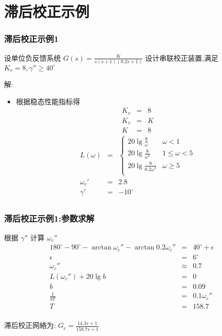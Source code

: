 \documentclass[table]{beamer}
\begin{document}
\section{滞后校正示例}
\label{sec-2}
\begin{frame}
\frametitle{滞后校正示例1}
\label{sec-2-1}

设单位负反馈系统 $G(s)=\frac{K}{s(s+1)(0.2s+1)}$ 设计串联校正装置,满足  $K_v=8, \gamma''\geq 40^{\circ}$ 

解:

\begin{itemize}
\item <2->根据稳态性能指标得
      \begin{eqnarray*}
      K_v & = &8 \\
      K_v &= & K \\
       K &=& 8
      \end{eqnarray*}
      \begin{eqnarray*}
      L(\omega) & = & \begin{cases}20\lg\frac{8}{\omega} & \omega <1 \\
                                   20\lg\frac{8}{\omega^2} & 1\leq \omega < 5 \\
                                   20\lg\frac{8}{0.2\omega^3} &  \omega \geq 5 \\  \end{cases}\\
      \omega_c' &=& 2.8 \\
      \gamma' &=& -10^{\circ} \\
      \end{eqnarray*}
\end{itemize}
\end{frame}
\begin{frame}
\frametitle{滞后校正示例1:参数求解}
\label{sec-2-2}

根据  $\gamma''$  计算  $\omega_c''$ 
\begin{eqnarray*}
180^{\circ}-90^{\circ}-\arctan\omega_c''-\arctan0.2\omega_c'' & = & 40^{\circ}+\epsilon\\
\epsilon &=& 6^{\circ} \\
\omega_c'' &\approx& 0.7 \\
L(\omega_c'') +20\lg b&=& 0 \\
b &=& 0.09 \\
\frac{1}{bT} &=& 0.1\omega_c''\\
T &=& 158.7 \\
\end{eqnarray*}

滞后校正网絡为:  $G_c=\frac{14.3s+1}{158.7s+1}$ 
\end{frame}
\end{document}
